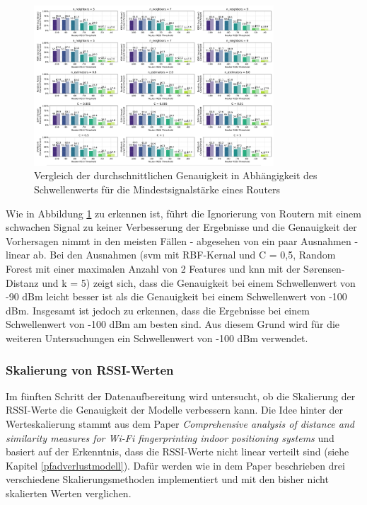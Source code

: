 \begin{figure}[H]
    \centering
    \includegraphics[width=0.8\textwidth]{images/09_router_rssi_threshold_03.png}
    \caption{Vergleich der durchschnittlichen Genauigkeit in Abhängigkeit des Schwellenwerts für die Mindestsignalstärke eines Routers}
    \label{fig:09_router_rssi_threshold_03}
\end{figure}

Wie in Abbildung \ref{fig:09_router_rssi_threshold_03} zu erkennen ist, führt die Ignorierung von Routern mit einem schwachen Signal zu keiner Verbesserung der Ergebnisse und die Genauigkeit der Vorhersagen nimmt in den meisten Fällen - abgesehen von ein paar Ausnahmen - linear ab. Bei den Ausnahmen (\gls{svm} mit RBF-Kernal und C = 0,5, Random Forest mit einer maximalen Anzahl von 2 Features und \gls{knn} mit der Sørensen-Distanz und k = 5) zeigt sich, dass die Genauigkeit bei einem Schwellenwert von -90 dBm leicht besser ist als die Genauigkeit bei einem Schwellenwert von -100 dBm. Insgesamt ist jedoch zu erkennen, dass die Ergebnisse bei einem Schwellenwert von -100 dBm am besten sind. Aus diesem Grund wird für die weiteren Untersuchungen ein Schwellenwert von -100 dBm verwendet.

\subsubsection{Skalierung von RSSI-Werten}

Im fünften Schritt der Datenaufbereitung wird untersucht, ob die Skalierung der RSSI-Werte die Genauigkeit der Modelle verbessern kann. Die Idee hinter der Werteskalierung stammt aus dem Paper \textit{Comprehensive analysis of distance and similarity measures for Wi-Fi fingerprinting indoor positioning systems} und basiert auf der Erkenntnis, dass die RSSI-Werte nicht linear verteilt sind (siehe Kapitel \ref{pfadverlustmodell}). Dafür werden wie in dem Paper beschrieben drei verschiedene Skalierungsmethoden implementiert und mit den bisher nicht skalierten Werten verglichen.

